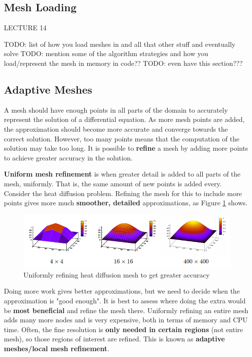 \documentclass{article}
\begin{document}
\subsection{Mesh Loading}
\label{sec:mesh-loading}

LECTURE 14

TODO: list of how you load meshes in and all that other stuff and eventually solve
TODO: mention some of the algorithm strategies and how you load/represent the mesh in memory in code??
TODO: even have this section???

\subsection{Adaptive Meshes}
\label{sec:adaptive-meshes}

A mesh should have enough points in all parts of the domain to accurately represent the solution of a differential equation. As more mesh points are added, the approximation should become more accurate and converge towards the correct solution. However, too many points means that the computation of the solution may take too long. It is possible to \textbf{refine} a mesh by adding more points to achieve greater accuracy in the solution.

\textbf{Uniform mesh refinement} is when greater detail is added to all parts of the mesh, uniformly. That is, the same amount of new points is added every. Consider the heat diffusion problem. Refining the mesh for this to include more points gives more much \textbf{smoother, detailed} approximations, as Figure \ref{fig:uniform-refinement} shows.

\begin{figure}
	\centering
	\includegraphics[scale=0.6]{figures/uniform-refinement.png}
	\caption{Uniformly refining heat diffusion mesh to get greater accuracy}
	\label{fig:uniform-refinement}
\end{figure}

Doing more work gives better approximations, but we need to decide when the approximation is "good enough". It is best to assess where doing the extra would be \textbf{most beneficial} and refine the mesh there. Uniformly refining an entire mesh adds many more nodes and is very expensive, both in terms of memory and CPU time. Often, the fine resolution is \textbf{only needed in certain regions} (not entire mesh), so those regions of interest are refined. This is known as \textbf{adaptive meshes/local mesh refinement}.
\end{document}
